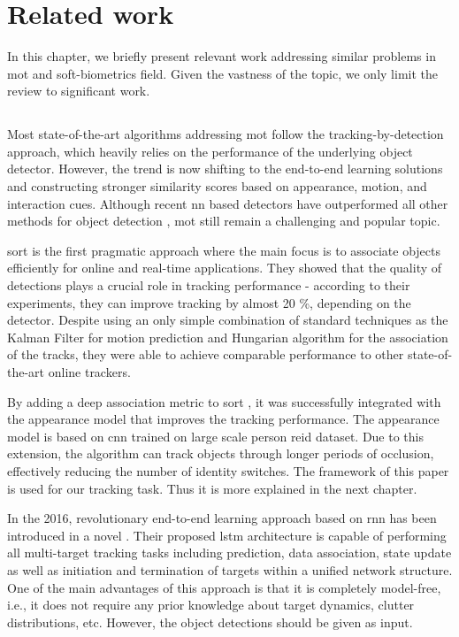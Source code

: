 \chapter{Related work}
    In this chapter, we briefly present relevant work addressing similar problems in \gls{mot} and soft-biometrics field. Given the vastness of the topic, we only limit the review to significant work.

\section{}
     Most state-of-the-art algorithms addressing \gls{mot} follow the tracking-by-detection approach, which heavily relies on the performance of the underlying object detector. However, the trend is now shifting to the end-to-end learning solutions and constructing stronger similarity scores based on appearance, motion, and interaction cues. Although recent \gls{nn} based detectors have outperformed all other methods for object detection \cite{russakovsky2015imagenet, ren2015faster, redmon2016you}, \gls{mot} still remain a challenging and popular topic.
   
    \Gls{sort} \cite{bewley2016simple} is the first pragmatic approach where the main focus is to associate objects efficiently for online and real-time applications. They showed that the quality of detections plays a crucial role in tracking performance - according to their experiments, they can improve tracking by almost 20 \%, depending on the detector. Despite using an only simple combination of standard techniques as the Kalman Filter for motion prediction and Hungarian algorithm for the association of the tracks, they were able to achieve comparable performance to other state-of-the-art online trackers. 
    
    By adding a deep association metric to \gls{sort} \cite{wojke2017simple}, it was successfully integrated with the appearance model that improves the tracking performance. The appearance model is based on \gls{cnn} trained on large scale person \gls{reid} dataset. Due to this extension, the algorithm can track objects through longer periods of occlusion, effectively reducing the number of identity switches. The framework of this paper is used for our tracking task. Thus it is more explained in the next chapter. 

    In the 2016, revolutionary end-to-end learning approach based on \gls{rnn} has been introduced in a novel \cite{milan2017online}. Their proposed \gls{lstm} architecture is capable of performing all multi-target tracking tasks including prediction, data association, state update as well as initiation and termination of targets within a unified network structure. One of the main advantages of this approach is that it is completely model-free, i.e., it does not require any prior knowledge about target dynamics, clutter distributions, etc. However, the object detections should be given as input.
    
